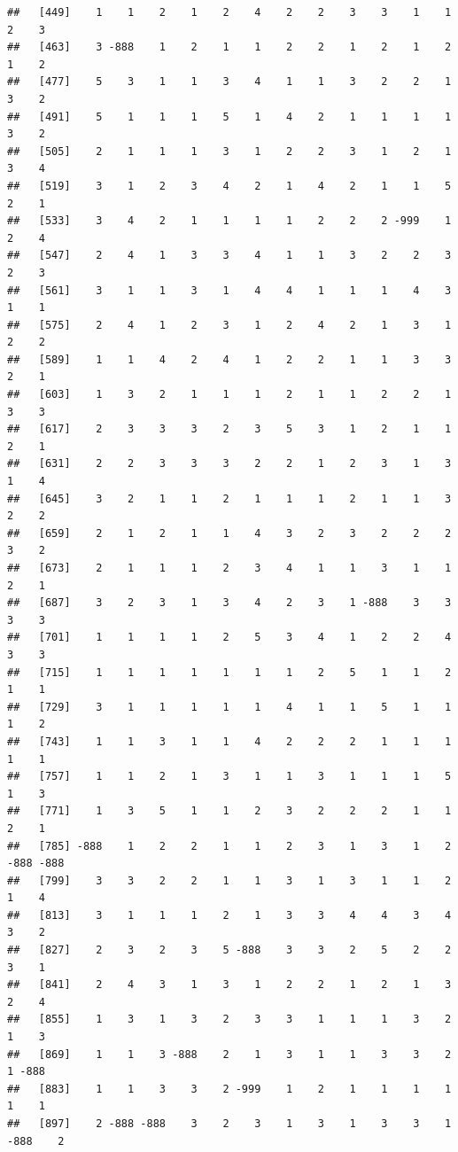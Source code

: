 \documentclass[
  12pt,
  openany]{book}
\begin{document}
\begin{verbatim}
##   [449]    1    1    2    1    2    4    2    2    3    3    1    1    2    3
##   [463]    3 -888    1    2    1    1    2    2    1    2    1    2    1    2
##   [477]    5    3    1    1    3    4    1    1    3    2    2    1    3    2
##   [491]    5    1    1    1    5    1    4    2    1    1    1    1    3    2
##   [505]    2    1    1    1    3    1    2    2    3    1    2    1    3    4
##   [519]    3    1    2    3    4    2    1    4    2    1    1    5    2    1
##   [533]    3    4    2    1    1    1    1    2    2    2 -999    1    2    4
##   [547]    2    4    1    3    3    4    1    1    3    2    2    3    2    3
##   [561]    3    1    1    3    1    4    4    1    1    1    4    3    1    1
##   [575]    2    4    1    2    3    1    2    4    2    1    3    1    2    2
##   [589]    1    1    4    2    4    1    2    2    1    1    3    3    2    1
##   [603]    1    3    2    1    1    1    2    1    1    2    2    1    3    3
##   [617]    2    3    3    3    2    3    5    3    1    2    1    1    2    1
##   [631]    2    2    3    3    3    2    2    1    2    3    1    3    1    4
##   [645]    3    2    1    1    2    1    1    1    2    1    1    3    2    2
##   [659]    2    1    2    1    1    4    3    2    3    2    2    2    3    2
##   [673]    2    1    1    1    2    3    4    1    1    3    1    1    2    1
##   [687]    3    2    3    1    3    4    2    3    1 -888    3    3    3    3
##   [701]    1    1    1    1    2    5    3    4    1    2    2    4    3    3
##   [715]    1    1    1    1    1    1    1    2    5    1    1    2    1    1
##   [729]    3    1    1    1    1    1    4    1    1    5    1    1    1    2
##   [743]    1    1    3    1    1    4    2    2    2    1    1    1    1    1
##   [757]    1    1    2    1    3    1    1    3    1    1    1    5    1    3
##   [771]    1    3    5    1    1    2    3    2    2    2    1    1    2    1
##   [785] -888    1    2    2    1    1    2    3    1    3    1    2 -888 -888
##   [799]    3    3    2    2    1    1    3    1    3    1    1    2    1    4
##   [813]    3    1    1    1    2    1    3    3    4    4    3    4    3    2
##   [827]    2    3    2    3    5 -888    3    3    2    5    2    2    3    1
##   [841]    2    4    3    1    3    1    2    2    1    2    1    3    2    4
##   [855]    1    3    1    3    2    3    3    1    1    1    3    2    1    3
##   [869]    1    1    3 -888    2    1    3    1    1    3    3    2    1 -888
##   [883]    1    1    3    3    2 -999    1    2    1    1    1    1    1    1
##   [897]    2 -888 -888    3    2    3    1    3    1    3    3    1 -888    2

\end{verbatim}
\end{document}

